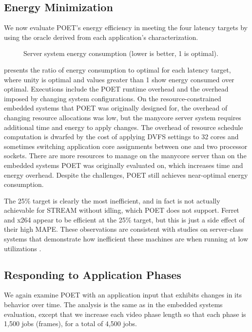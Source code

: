 \subsection{Energy Minimization}

We now evaluate POET's energy efficiency in meeting the four latency targets by using the oracle derived from each application's characterization.

\begin{figure}[t]
  \centering
    
  \caption{Server system energy consumption (lower is better, 1 is optimal).}
  \label{fig:poet-server-ee}
\end{figure}

 presents the ratio of energy consumption to optimal for each latency target, where unity is optimal and values greater than 1 show energy consumed over optimal.
Executions include the POET runtime overhead and the overhead imposed by changing system configurations.
On the resource-constrained embedded systems that POET was originally designed for, the overhead of changing resource allocations was low, but the manycore server system requires additional time and energy to apply changes.
The overhead of resource schedule computation is dwarfed by the cost of applying DVFS settings to 32 cores and sometimes switching application core assignments between one and two processor sockets.
There are more resources to manage on the manycore server than on the embedded systems POET was originally evaluated on, which increases time and energy overhead.
Despite the challenges, POET still achieves near-optimal energy consumption.

The 25\% target is clearly the most inefficient, and in fact is not actually achievable for STREAM without idling, which POET does not support.  
Ferret and x264 appear to be efficient at the 25\% target, but this is just a side effect of their high MAPE.
These observations are consistent with studies on server-class systems that demonstrate how inefficient these machines are when running at low utilizations \cite{google,pupil}.


\subsection{Responding to Application Phases}

We again examine POET with an application input that exhibits changes in its behavior over time.
The analysis is the same as in the embedded systems evaluation, except that we increase each video phase length so that each phase is 1,500 jobs (frames), for a total of 4,500 jobs.

